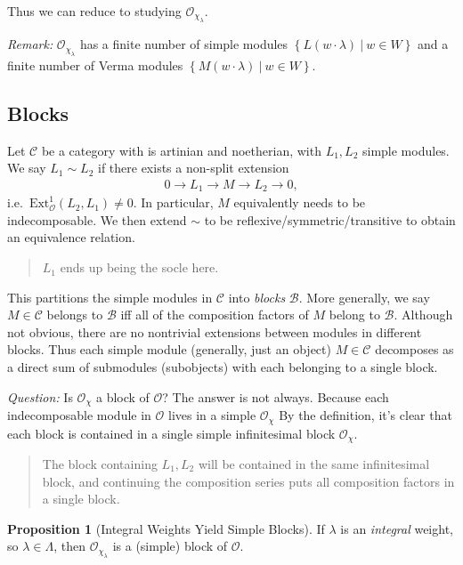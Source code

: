 \documentclass[11pt]{scrartcl}
\theoremstyle{definition}
\theoremstyle{theorem}
\newtheorem{proposition}[theorem]{Proposition}
\theoremstyle{proof}
\theoremstyle{definition}
\theoremstyle{break}
\theoremstyle{problem}
\newcommand{\ext}[0]{\text{Ext}}
\newcommand{\OO}[0]{{\mathcal{O}}}
\newcommand{\mcb}[0]{{\mathcal{B}}}
\newcommand{\mcc}[0]{{\mathcal{C}}}
\newcommand{\suchthat}[0]{{~\mathrel{\Big|}~}}
\newcommand{\theset}[1]{\left\{{#1}\right\}}
\renewcommand{\to}[0]{\longrightarrow}
\begin{document}
Thus we can reduce to studying \(\OO_{\chi_\lambda}\).

\emph{Remark:} \(\OO_{\chi_\lambda}\) has a finite number of simple
modules \(\theset{L(w\cdot \lambda) \suchthat w\in W}\) and a finite
number of Verma modules \(\theset{M(w\cdot \lambda) \suchthat w\in W}\).

\hypertarget{blocks}{%
\subsection{Blocks}\label{blocks}}

Let \(\mcc\) be a category with is artinian and noetherian, with
\(L_1, L_2\) simple modules. We say \(L_1 \sim L_2\) if there exists a
non-split extension
\begin{align*}0 \to L_1 \to M \to L_2 \to 0,\end{align*}
i.e.~\(\ext^1_\OO(L_2, L_1) \neq 0\). In particular, \(M\) equivalently
needs to be indecomposable. We then extend \(\sim\) to be
reflexive/symmetric/transitive to obtain an equivalence relation.

\begin{quote}
\(L_1\) ends up being the socle here.
\end{quote}

This partitions the simple modules in \(\mcc\) into \emph{blocks}
\(\mcb\). More generally, we say \(M\in \mcc\) belongs to \(\mcb\) iff
all of the composition factors of \(M\) belong to \(\mcb\). Although not
obvious, there are no nontrivial extensions between modules in different
blocks. Thus each simple module (generally, just an object)
\(M\in \mcc\) decomposes as a direct sum of submodules (subobjects) with
each belonging to a single block.

\emph{Question:} Is \(\OO_\chi\) a block of \(\OO\)? The answer is not
always. Because each indecomposable module in \(\OO\) lives in a simple
\(\OO_\chi\) By the definition, it's clear that each block is contained
in a single simple infinitesimal block \(\OO_\chi\).

\begin{quote}
The block containing \(L_1, L_2\) will be contained in the same
infinitesimal block, and continuing the composition series puts all
composition factors in a single block.
\end{quote}

\begin{proposition}[Integral Weights Yield Simple Blocks]

If \(\lambda\) is an \emph{integral} weight, so \(\lambda \in \Lambda\),
then \(\OO_{\chi_\lambda}\) is a (simple) block of
\(\OO\).\end{proposition}
\end{document}
